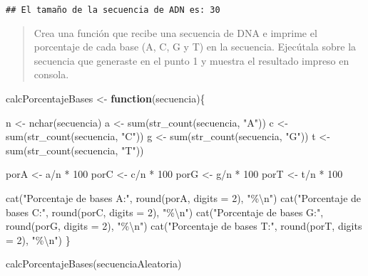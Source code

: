 \documentclass[
]{article}
\newenvironment{Shaded}{\begin{snugshade}}{\end{snugshade}}
\newcommand{\AttributeTok}[1]{\textcolor[rgb]{0.77,0.63,0.00}{#1}}
\newcommand{\ControlFlowTok}[1]{\textcolor[rgb]{0.13,0.29,0.53}{\textbf{#1}}}
\newcommand{\DecValTok}[1]{\textcolor[rgb]{0.00,0.00,0.81}{#1}}
\newcommand{\FunctionTok}[1]{\textcolor[rgb]{0.00,0.00,0.00}{#1}}
\newcommand{\NormalTok}[1]{#1}
\newcommand{\OtherTok}[1]{\textcolor[rgb]{0.56,0.35,0.01}{#1}}
\newcommand{\SpecialCharTok}[1]{\textcolor[rgb]{0.00,0.00,0.00}{#1}}
\newcommand{\StringTok}[1]{\textcolor[rgb]{0.31,0.60,0.02}{#1}}
\begin{document}
\begin{verbatim}
## El tamaño de la secuencia de ADN es: 30
\end{verbatim}

\begin{quote}
Crea una función que recibe una secuencia de DNA e imprime el porcentaje
de cada base (A, C, G y T) en la secuencia. Ejecútala sobre la secuencia
que generaste en el punto 1 y muestra el resultado impreso en consola.
\end{quote}

\begin{Shaded}
\begin{Highlighting}[]
\NormalTok{calcPorcentajeBases }\OtherTok{\textless{}{-}} \ControlFlowTok{function}\NormalTok{(secuencia)\{}
  
\NormalTok{  n }\OtherTok{\textless{}{-}} \FunctionTok{nchar}\NormalTok{(secuencia)}
\NormalTok{  a }\OtherTok{\textless{}{-}} \FunctionTok{sum}\NormalTok{(}\FunctionTok{str\_count}\NormalTok{(secuencia, }\StringTok{"A"}\NormalTok{)) }
\NormalTok{  c }\OtherTok{\textless{}{-}} \FunctionTok{sum}\NormalTok{(}\FunctionTok{str\_count}\NormalTok{(secuencia, }\StringTok{"C"}\NormalTok{)) }
\NormalTok{  g }\OtherTok{\textless{}{-}} \FunctionTok{sum}\NormalTok{(}\FunctionTok{str\_count}\NormalTok{(secuencia, }\StringTok{"G"}\NormalTok{))}
\NormalTok{  t }\OtherTok{\textless{}{-}} \FunctionTok{sum}\NormalTok{(}\FunctionTok{str\_count}\NormalTok{(secuencia, }\StringTok{"T"}\NormalTok{))}

\NormalTok{  porA }\OtherTok{\textless{}{-}}\NormalTok{ a}\SpecialCharTok{/}\NormalTok{n }\SpecialCharTok{*} \DecValTok{100}
\NormalTok{  porC }\OtherTok{\textless{}{-}}\NormalTok{ c}\SpecialCharTok{/}\NormalTok{n }\SpecialCharTok{*} \DecValTok{100}
\NormalTok{  porG }\OtherTok{\textless{}{-}}\NormalTok{ g}\SpecialCharTok{/}\NormalTok{n }\SpecialCharTok{*} \DecValTok{100}
\NormalTok{  porT }\OtherTok{\textless{}{-}}\NormalTok{ t}\SpecialCharTok{/}\NormalTok{n }\SpecialCharTok{*} \DecValTok{100}
  
  \FunctionTok{cat}\NormalTok{(}\StringTok{"Porcentaje de bases A:"}\NormalTok{, }\FunctionTok{round}\NormalTok{(porA, }\AttributeTok{digits =} \DecValTok{2}\NormalTok{), }\StringTok{"\%}\SpecialCharTok{\textbackslash{}n}\StringTok{"}\NormalTok{)}
  \FunctionTok{cat}\NormalTok{(}\StringTok{"Porcentaje de bases C:"}\NormalTok{, }\FunctionTok{round}\NormalTok{(porC, }\AttributeTok{digits =} \DecValTok{2}\NormalTok{), }\StringTok{"\%}\SpecialCharTok{\textbackslash{}n}\StringTok{"}\NormalTok{)}
  \FunctionTok{cat}\NormalTok{(}\StringTok{"Porcentaje de bases G:"}\NormalTok{, }\FunctionTok{round}\NormalTok{(porG, }\AttributeTok{digits =} \DecValTok{2}\NormalTok{), }\StringTok{"\%}\SpecialCharTok{\textbackslash{}n}\StringTok{"}\NormalTok{)}
  \FunctionTok{cat}\NormalTok{(}\StringTok{"Porcentaje de bases T:"}\NormalTok{, }\FunctionTok{round}\NormalTok{(porT, }\AttributeTok{digits =} \DecValTok{2}\NormalTok{), }\StringTok{"\%}\SpecialCharTok{\textbackslash{}n}\StringTok{"}\NormalTok{)}
\NormalTok{\}}

\FunctionTok{calcPorcentajeBases}\NormalTok{(secuenciaAleatoria)}
\end{Highlighting}
\end{Shaded}
\end{document}
